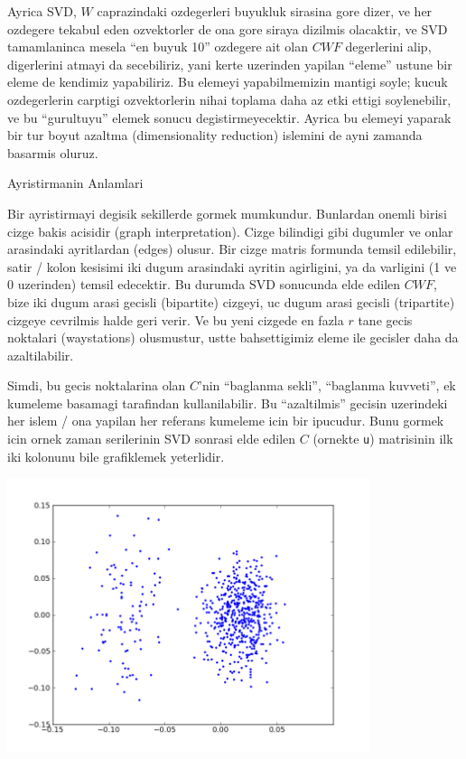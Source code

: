 \documentclass[12pt,fleqn]{article}\usepackage{../common}
\begin{document}
Ayrica SVD, $W$ caprazindaki ozdegerleri buyukluk sirasina gore dizer, ve
her ozdegere tekabul eden ozvektorler de ona gore siraya dizilmis
olacaktir, ve SVD tamamlaninca mesela ``en buyuk 10'' ozdegere ait olan
$CWF$ degerlerini alip, digerlerini atmayi da secebiliriz, yani kerte
uzerinden yapilan ``eleme'' ustune bir eleme de kendimiz yapabiliriz. Bu
elemeyi yapabilmemizin mantigi soyle; kucuk ozdegerlerin carptigi
ozvektorlerin nihai toplama daha az etki ettigi soylenebilir, ve bu
``gurultuyu'' elemek sonucu degistirmeyecektir. Ayrica bu elemeyi yaparak
bir tur boyut azaltma (dimensionality reduction) islemini de ayni zamanda
basarmis oluruz.

Ayristirmanin Anlamlari

Bir ayristirmayi degisik sekillerde gormek mumkundur. Bunlardan onemli
birisi cizge bakis acisidir (graph interpretation). Cizge bilindigi gibi
dugumler ve onlar arasindaki ayritlardan (edges) olusur. Bir cizge matris
formunda temsil edilebilir, satir / kolon kesisimi iki dugum arasindaki
ayritin agirligini, ya da varligini (1 ve 0 uzerinden) temsil edecektir. Bu
durumda SVD sonucunda elde edilen $CWF$, bize iki dugum arasi gecisli
(bipartite) cizgeyi, uc dugum arasi gecisli (tripartite) cizgeye cevrilmis
halde geri verir. Ve bu yeni cizgede en fazla $r$ tane gecis noktalari
(waystations) olusmustur, ustte bahsettigimiz eleme ile gecisler daha da
azaltilabilir. 

Simdi, bu gecis noktalarina olan $C$'nin ``baglanma sekli'', ``baglanma
kuvveti'', ek kumeleme basamagi tarafindan kullanilabilir. Bu
``azaltilmis'' gecisin uzerindeki her islem / ona yapilan her referans
kumeleme icin bir ipucudur. Bunu gormek icin ornek zaman serilerinin SVD
sonrasi elde edilen $C$ (ornekte \verb!u!) matrisinin ilk iki kolonunu bile
grafiklemek yeterlidir.



\includegraphics[height=8cm]{2d.png}
\end{document}
